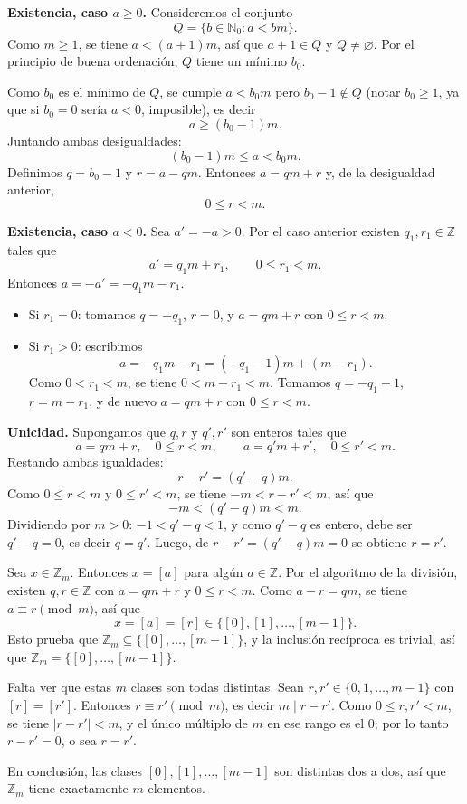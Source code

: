 \begin{demostracion}
\textbf{Existencia, caso $a \ge 0$.}
Consideremos el conjunto
\[
Q = \{ b \in \mathbb{N}_0 : a < bm \}.
\]
Como $m\ge 1$, se tiene $a < (a+1)m$, así que $a+1 \in Q$ y $Q \neq
\varnothing$. Por el principio de buena ordenación, $Q$ tiene un
mínimo $b_0$.

Como $b_0$ es el mínimo de $Q$, se cumple $a<b_0 m$ pero $b_0-1
\notin Q$ (notar $b_0 \ge 1$, ya que si $b_0=0$ sería $a<0$,
imposible), es decir
\[
a \ge (b_0-1)m.
\]
Juntando ambas desigualdades:
\[
(b_0-1)m \le a < b_0 m.
\]
Definimos $q=b_0-1$ y $r=a-qm$. Entonces $a=qm+r$ y, de la
desigualdad anterior,
\[
0 \le r < m.
\]

\textbf{Existencia, caso $a<0$.}
Sea $a'=-a>0$. Por el caso anterior existen $q_1,r_1\in\mathbb{Z}$
tales que
\[
a' = q_1 m + r_1, \qquad 0\le r_1<m.
\]
Entonces $a=-a' = -q_1 m - r_1$.

\begin{itemize}
    \item Si $r_1=0$: tomamos $q=-q_1$, $r=0$, y $a=qm+r$ con
    $0\le r<m$.
    \item Si $r_1>0$: escribimos
    \[
    a = -q_1 m - r_1 = (-q_1-1)m + (m-r_1).
    \]
    Como $0<r_1<m$, se tiene $0<m-r_1<m$. Tomamos $q=-q_1-1$,
    $r=m-r_1$, y de nuevo $a=qm+r$ con $0\le r<m$.
\end{itemize}

\textbf{Unicidad.} Supongamos que $q,r$ y $q',r'$ son enteros tales
que
\[
a=qm+r, \quad 0\le r<m, \qquad a=q'm+r', \quad 0\le r'<m.
\]
Restando ambas igualdades:
\[
r-r' = (q'-q)m.
\]
Como $0\le r<m$ y $0\le r'<m$, se tiene $-m<r-r'<m$, así que
\[
-m < (q'-q)m < m.
\]
Dividiendo por $m>0$: $-1<q'-q<1$, y como $q'-q$ es entero, debe ser
$q'-q=0$, es decir $q=q'$. Luego, de $r-r'=(q'-q)m=0$ se obtiene
$r=r'$.
\end{demostracion}

\begin{demostracion}[{title={Demostración de la proposición $\mathbb{Z}_m=\{[0],\dots,[m-1]\}$}}]
Sea $x \in \mathbb{Z}_m$. Entonces $x=[a]$ para algún $a\in\mathbb{Z}$.
Por el algoritmo de la división, existen $q,r\in\mathbb{Z}$ con
$a=qm+r$ y $0\le r<m$. Como $a-r=qm$, se tiene $a\equiv r \pmod m$,
así que
\[
x = [a] = [r] \in \{[0],[1],\dots,[m-1]\}.
\]
Esto prueba que $\mathbb{Z}_m \subseteq \{[0],\dots,[m-1]\}$, y la
inclusión recíproca es trivial, así que
$\mathbb{Z}_m=\{[0],\dots,[m-1]\}$.

Falta ver que estas $m$ clases son todas distintas. Sean
$r,r'\in\{0,1,\dots,m-1\}$ con $[r]=[r']$. Entonces $r\equiv r'
\pmod m$, es decir $m \mid r-r'$. Como $0\le r,r'<m$, se tiene
$|r-r'|<m$, y el único múltiplo de $m$ en ese rango es el $0$; por lo
tanto $r-r'=0$, o sea $r=r'$.

En conclusión, las clases $[0],[1],\dots,[m-1]$ son distintas dos a
dos, así que $\mathbb{Z}_m$ tiene exactamente $m$ elementos.
\end{demostracion}

